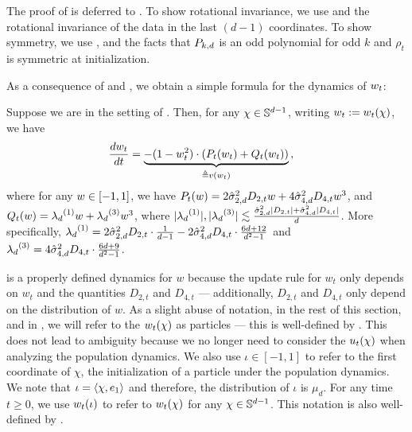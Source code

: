 The proof of  is deferred to . To show rotational invariance, we use  and the rotational invariance of the data in the last $(d - 1)$ coordinates. To show symmetry, we use , and the facts that ${P_{k, d}}$ is an odd polynomial for odd $k$ and $\rho_t$ is symmetric at initialization.

As a consequence of  and , we obtain a simple formula for the dynamics of $w_t$:

\begin{lemma}  \label{lem:1-d-traj}
Suppose we are in the setting of . Then, for any $\chi \in \mathbb{S}^{d - 1}$, writing $w_t := w_t(\chi)$, we have
    \begin{align}\label{equ:1-d-traj}
\frac{dw_t}{dt} & = \underbrace{-(1 - w_t^2) \cdot (P_t(w_t) + Q_t(w_t))}_{\triangleq v(w_t)} \,,
\end{align}
where for any $w \in [-1, 1]$, we have $P_t(w) = 2 \hat{\sigma}_{2, d}^2 {D_{2, t}} w + 4 \hat{\sigma}_{4, d}^2 {D_{4, t}} w^3$, and $Q_t(w) = {\lambda_d}^{(1)} w + {\lambda_d}^{(3)} w^3$, where $|{\lambda_d}^{(1)}|, |{\lambda_d}^{(3)}| \lesssim \frac{\hat{\sigma}_{2, d}^2 |D_{2, t}| + \hat{\sigma}_{4, d}^2 |D_{4, t}|}{d}$. More specifically, ${\lambda_d}^{(1)} = 2 \hat{\sigma}_{2, d}^2 D_{2, t} \cdot \frac{1}{d - 1} - 2 \hat{\sigma}_{4, d}^2 D_{4, t} \cdot \frac{6d + 12}{d^2 - 1}$ and ${\lambda_d}^{(3)} = 4 \hat{\sigma}_{4, d}^2 D_{4, t} \cdot \frac{6d + 9}{d^2 - 1}$.
\end{lemma}


 is a properly defined dynamics for $w$ because the update rule for $w_t$ only depends on $w_t$ and the quantities $D_{2, t}$ and $D_{4, t}$ --- additionally, $D_{2, t}$ and $D_{4, t}$ only depend on the distribution of $w$. As a slight abuse of notation, in the rest of this section, and in , we will refer to the $w_t(\chi)$ as particles --- this is well-defined by . This does not lead to ambiguity because we no longer need to consider the $u_t(\chi)$ when analyzing the population dynamics. We also use $\iota \in [-1, 1]$ to refer to the first coordinate of $\chi$, the initialization of a particle under the population dynamics. We note that $\iota = \left<\chi, e_1\right>$ and therefore, the distribution of $\iota$ is $\mu_d$. For any time $t \geq 0$, we use $w_t(\iota)$ to refer to $w_t(\chi)$ for any $\chi \in \mathbb{S}^{d - 1}$. This notation is also well-defined by .

